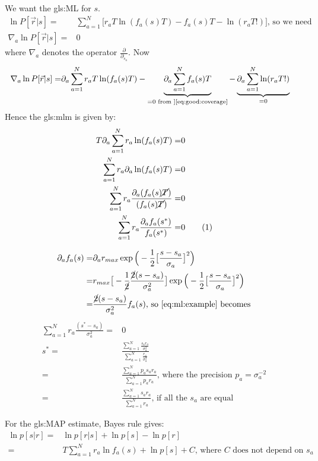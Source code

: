 \documentclass[]{article}
\newcommand\numberthis{\addtocounter{equation}{1}\tag{\theequation}}
\begin{document}
We want the \gls{gls:ML} for $s$.
\begin{align*}
	\ln P[\vec{r}\vert s] =& \sum_{a=1}^{N} \big[r_aT \ln (f_a(s)T) -f_a(s)T - \ln (r_aT!) \big] \text{, so we need}\\
	\nabla_a \ln P[\vec{r}\vert s] =& 0	
\end{align*}
 where  $\nabla_a$ denotes the operator $\frac{\partial}{\partial_{s_a}}$. Now
\begin{align*}
	\nabla_a \ln P[\vec{r}\vert s] = & \partial_a \sum_{a=1}^{N}  r_aT \ln (f_a(s)T) -\underbrace{\partial_a \sum_{a=1}^{N} f_a(s)T}_{=0 \text { from ]\eqref{eq:good:coverage}}} - \underbrace{\partial_a \sum_{a=1}^{N} \ln (r_aT!)}_{=0} 
\end{align*}
Hence the \gls{gls:mlm} is given by:
\begin{align*}
	T \partial_a \sum_{a=1}^{N} r_a  \ln (f_a(s)T) =& 0\\
	 \sum_{a=1}^{N} r_a  \partial_a \ln (f_a(s)T) =& 0\\
	 \sum_{a=1}^{N} r_a  \frac{\partial_a  (f_a(s)\cancel{T})}{(f_a(s)\cancel{T})} =& 0\\
	 \sum_{a=1}^{N} r_a  \frac{\partial_a  f_a(s^*)}{f_a(s^*)} =& 0 \numberthis \label{eq:ml:example}
\end{align*}

\begin{align*}
	\partial_a  f_a(s) =& \partial_a r_{max} \exp \Big(-\frac{1}{2}\big[\frac{s-s_a}{\sigma_a}\big]^2\Big)\\
	=&r_{max}\big[-\frac{1}{\cancel{2}} \frac{\cancel{2}(s-s_a)}{\sigma_a^2}\big] \exp \Big(-\frac{1}{2}\big[\frac{s-s_a}{\sigma_a}\big]^2\Big)\\
	=& \frac{\cancel{2}(s-s_a)}{\sigma_a^2} f_a(s) \text{, so \eqref{eq:ml:example} becomes}
\end{align*}
\begin{align*}
	\sum_{a=1}^{N} r_a  \frac{(s^*-s_a)}{\sigma_a^2} =& 0\\
	s^*  =& \frac{\sum_{a=1}^{N}   \frac{s_a r_a}{\sigma_a^2}}{\sum_{a=1}^{N} \frac{ r_a }{\sigma_a^2}}	\\
	=& \frac{\sum_{a=1}^{N}   p_a s_a r_a}{\sum_{a=1}^{N} p_a r_a} \text{, where the precision $p_a=\sigma_a^{-2}$}\\
	=& \frac{\sum_{a=1}^{N}   s_a r_a}{\sum_{a=1}^{N} r_a} \text{, if all the $s_a$ are equal}
\end{align*}

For the \gls{gls:MAP} estimate, Bayes rule gives:
\begin{align*}
	\ln p[s|r] =& \ln p[r|s] + \ln p[s] - \ln p[r]\\
	=& T \sum_{a=1}^{N}r_a \ln f_a(s) + \ln p[s] + C \text{, where $C$ does not depend on $s_a$}
\end{align*}
\end{document}
